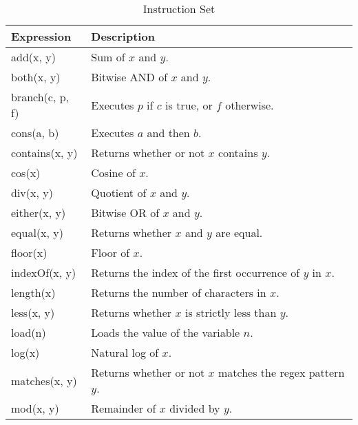 \documentclass[../main.tex]{subfiles}
\begin{document}
\begin{table}[ht]
  \caption{Instruction Set}
  \centering
  \begin{tabular}{l | l}
    \hline\hline
    Expression & Description                                                                      \\
    \hline
    add(x, y)                & Sum of $x$ and $y$.                                                \\
    both(x, y)               & Bitwise AND of $x$ and $y$.                                        \\
    branch(c, p, f)          & Executes $p$ if $c$ is true, or $f$ otherwise.                     \\
    cons(a, b)               & Executes $a$ and then $b$.                                         \\
    contains(x, y)           & Returns whether or not $x$ contains $y$.                           \\
    cos(x)                   & Cosine of $x$.                                                     \\
    div(x, y)                & Quotient of $x$ and $y$.                                           \\
    either(x, y)             & Bitwise OR of $x$ and $y$.                                         \\
    equal(x, y)              & Returns whether $x$ and $y$ are equal.                             \\
    floor(x)                 & Floor of $x$.                                                      \\
    indexOf(x, y)            & Returns the index of the first occurrence of $y$ in $x$.           \\
    length(x)                & Returns the number of characters in $x$.                           \\
    less(x, y)               & Returns whether $x$ is strictly less than $y$.                     \\
    load(n)                  & Loads the value of the variable $n$.                               \\
    log(x)                   & Natural log of $x$.                                                \\
    matches(x, y)            & Returns whether or not $x$ matches the regex pattern $y$.          \\
    mod(x, y)                & Remainder of $x$ divided by $y$.                                   \\

\end{tabular}
\end{table}
\end{document}
